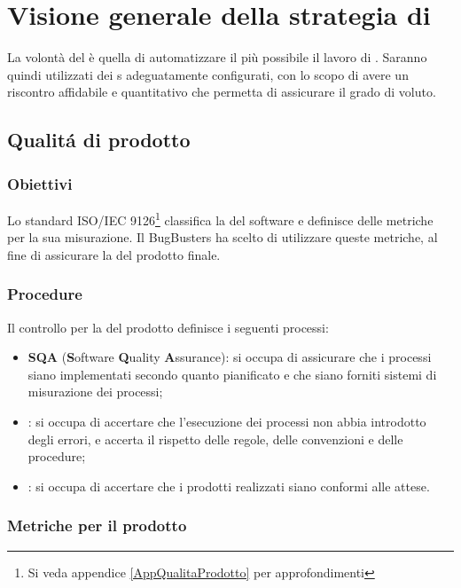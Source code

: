 \section{Visione generale della strategia di }
La volontà del  è quella di automatizzare il più possibile il lavoro di . Saranno quindi utilizzati dei s adeguatamente configurati, con lo scopo di avere un riscontro affidabile e quantitativo che permetta di assicurare il grado di  voluto. 

\subsection{Qualit\'a di prodotto}
\subsubsection{Obiettivi}
Lo standard ISO/IEC 9126\footnote{Si veda appendice \ref{AppQualitaProdotto} per approfondimenti} classifica la  del software e definisce delle metriche per la sua misurazione. Il  BugBusters ha scelto di utilizzare queste metriche, al fine di assicurare la  del prodotto finale.

\subsubsection{Procedure}
Il controllo per la  del prodotto definisce i seguenti processi:
\begin{itemize}
	\item \textbf{SQA} (\textbf{S}oftware \textbf{Q}uality \textbf{A}ssurance): si occupa di assicurare che i processi siano implementati secondo quanto pianificato e che siano forniti sistemi di misurazione dei processi;
	\item \textbf{}: si occupa di accertare che l'esecuzione dei processi non abbia introdotto degli errori, e accerta il rispetto delle regole, delle convenzioni e delle procedure;
	\item \textbf{}: si occupa di accertare che i prodotti realizzati siano conformi alle attese.
\end{itemize}

\subsubsection{Metriche per il prodotto}\label{MetricheSoftware}

